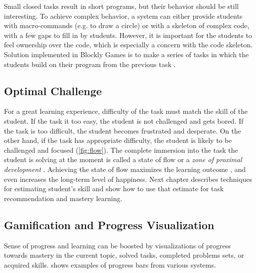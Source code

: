 Small closed tasks result in short programs,
  but their behavior should be still interesting. %
To achieve complex behavior,
  a system can either provide students with macro-commands (e.g. to draw a circle)
  or with a skeleton of complex code, with a few gaps to fill in by students.
However, it is important for the students to feel ownership over the code,
  which is especially a concern with the code skeleton.
Solution implemented in Blockly Games
  is to make a series of tasks in which the students
  build on their program from the previous task
  \cite{blockly-10-things}.



\subsection{Optimal Challenge}  %
\label{sec:motivation.challenge}
For a great learning experience,
  difficulty of the task must match the skill of the student.
If the task it too easy,
  the student is not challenged and gets bored.
If the task is too difficult,
  the student becomes frustrated and desperate.
On the other hand, if the task has appropriate difficulty,
  the student is likely to be challenged and focused
  (\cref{fig:flow}).
The complete immersion into the task the student is solving at the moment is called
  a state of flow \cite{flow}
  or a \emph{zone of proximal development} \cite{zone-of-proximal-development}.
Achieving the state of flow maximizes the learning outcome \cite{adaptive-practice},
  and even increases the long-term level of happiness. %
Next chapter describes techniques for estimating student’s skill
  and show how to use that estimate for task recommendation and mastery learning.


\subsection{Gamification and Progress Visualization}

Sense of progress and learning can be boosted by visualizations of
progress towards mastery in the current topic, solved tasks, completed problems sets,
or acquired skills.
 shows examples of progress bars from various systems.



